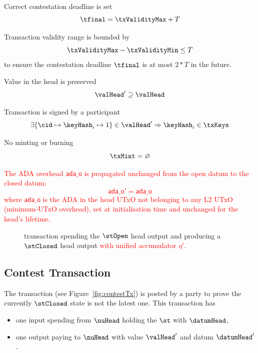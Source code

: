 \begin{menumerate}
	\item Correct contestation deadline is set
	\[
		\tfinal = \txValidityMax + T
	\]
	\item Transaction validity range is bounded by
	\[
		\txValidityMax - \txValidityMin \leq T
	\]
	to ensure the contestation deadline $\tfinal$ is at most $2*T$ in the future.
	\item Value in the head is preserved
	\[
		\valHead' \supseteq \valHead
	\]
	\item Transaction is signed by a participant
	\[
		\exists \{\cid \mapsto \keyHash_{i} \mapsto 1\} \in \valHead' \Rightarrow \keyHash_{i} \in \txKeys
	\]
	\item No minting or burning
	\[
		\txMint = \varnothing
	\]
	\item \textcolor{red}{The ADA overhead $\mathsf{ada\_o}$ is propagated unchanged from the open datum to the closed datum:
	\[
		\mathsf{ada\_o}' = \mathsf{ada\_o}
	\]
	where $\mathsf{ada\_o}$ is the ADA in the head UTxO not belonging to any L2 UTxO (minimum-UTxO overhead), set at initialisation time and unchanged for the head's lifetime.}
\end{menumerate}

\begin{figure}[H]
	\centering
	
	\caption{\mtxClose{} transaction spending the $\stOpen$ head output and producing a $\stClosed$ head output \textcolor{red}{with unified accumulator $\eta'$.}}\label{fig:closeTx}
\end{figure}

\subsection{Contest Transaction}\label{sec:contest-tx}

The \mtxContest{} transaction (see Figure~\ref{fig:contestTx}) is posted by a
party to prove the currently $\stClosed$ state is not the latest one. This
transaction has
\begin{itemize}
	\item one input spending from $\nuHead$ holding the $\st$ with $\datumHead$,
	\item one output paying to $\nuHead$ with value $\valHead'$ and
	      datum $\datumHead'$.
\end{itemize}

